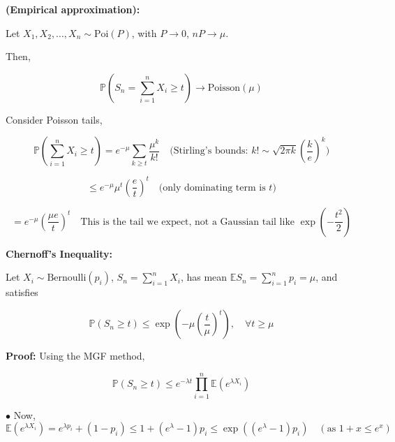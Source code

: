 \documentclass[12pt]{article}
\begin{document}
\textbf{(Empirical approximation):} 

Let \( X_1, X_2, \dots, X_n \sim \text{Poi}(P) \), with \( P \to 0 \), \( nP \to \mu \).

Then,

\[
\mathbb{P}\left(S_n = \sum_{i=1}^{n} X_i \geq t\right) \rightarrow \text{Poisson}(\mu)
\]

Consider Poisson tails,

\[
\mathbb{P}\left(\sum_{i=1}^{n} X_i \geq t\right) = e^{-\mu} \sum_{k \geq t} \frac{\mu^k}{k!} \quad \text{(Stirling's bounds: } k! \sim \sqrt{2 \pi k}\left(\frac{k}{e}\right)^k)
\]

\[
\leq e^{-\mu} \mu^t \left(\frac{e}{t}\right)^t \quad \text{(only dominating term is } t)
\]

\[
= e^{-\mu} \left(\frac{\mu e}{t}\right)^t \quad \text{This is the tail we expect, not a Gaussian tail like } \exp\left(-\frac{t^2}{2}\right)
\]

\textbf{Chernoff's Inequality:}

Let \( X_i \sim \text{Bernoulli}(p_i) \), \( S_n = \sum_{i=1}^{n} X_i \), has mean \( \mathbb{E}S_n = \sum_{i=1}^{n} p_i = \mu \), and satisfies

\[
\mathbb{P}\left( S_n \geq t\right) \leq \exp\left(-\mu \left(\frac{t}{\mu}\right)^t \right), \quad \forall t \geq \mu
\]

\textbf{Proof:} Using the MGF method,

\[
\mathbb{P}\left(S_n \geq t\right) \leq e^{-\lambda t} \prod_{i=1}^{n} \mathbb{E}\left(e^{\lambda X_i}\right)
\]

\(\bullet\) Now, \( \mathbb{E}\left(e^{\lambda X_i}\right) = e^{\lambda p_i} + (1 - p_i) \leq 1 + \left(e^{\lambda} - 1\right)p_i \leq \exp\left(\left(e^{\lambda} - 1\right) p_i\right) \quad (\text{as } 1 + x \leq e^x)
\)
\end{document}
